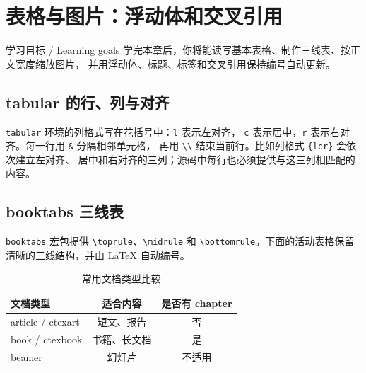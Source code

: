 %
\section{表格与图片：浮动体和交叉引用}

\begin{learningbox}{学习目标 / Learning goals}
学完本章后，你将能读写基本表格、制作三线表、按正文宽度缩放图片，
并用浮动体、标题、标签和交叉引用保持编号自动更新。
\end{learningbox}

\subsection{tabular 的行、列与对齐}

\texttt{tabular} 环境的列格式写在花括号中：\texttt{l} 表示左对齐，
\texttt{c} 表示居中，\texttt{r} 表示右对齐。每一行用 \verb|&| 分隔相邻单元格，
再用 \verb|\\| 结束当前行。比如列格式 \verb|{lcr}| 会依次建立左对齐、
居中和右对齐的三列；源码中每行也必须提供与这三列相匹配的内容。

\subsection{booktabs 三线表}

\texttt{booktabs} 宏包提供 \verb|\toprule|、\verb|\midrule| 和
\verb|\bottomrule|。下面的活动表格保留清晰的三线结构，并由 LaTeX 自动编号。

\begin{table}[htbp]
    \centering
    \caption{常用文档类型比较}
    \label{tab:document-types}
    \begin{tabular}{lcc}
        \toprule
        文档类型 & 适合内容 & 是否有 chapter \\
        \midrule
        article / ctexart & 短文、报告 & 否 \\
        book / ctexbook & 书籍、长文档 & 是 \\
        beamer & 幻灯片 & 不适用 \\
        \bottomrule
    \end{tabular}
\end{table}

